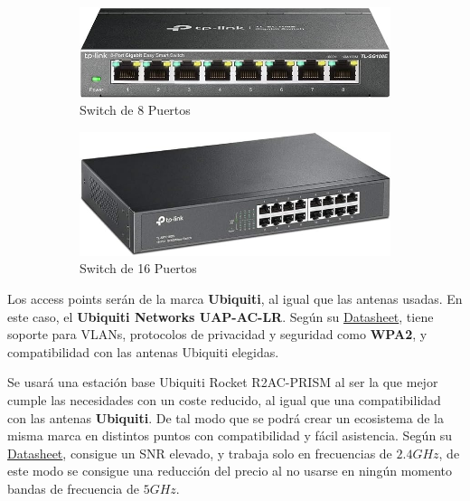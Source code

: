 \documentclass{article}
\begin{document}
\begin{figure}[h]
	\centering
	\begin{subfigure}{0.3\textwidth}
		\includegraphics[width=\linewidth]{src/switch 8.jpg}
		\caption{Switch de 8 Puertos}
		\label{fig:switch8}
	\end{subfigure}%
	\begin{subfigure}{0.3\textwidth}
		\includegraphics[width=\linewidth]{src/switch 16.jpg}
		\caption{Switch de 16 Puertos}
		\label{fig:switch16}
	\end{subfigure}
	\caption{}
	\label{fig:switches}
\end{figure}

Los access points serán de la marca \textbf{Ubiquiti}, al igual que las antenas usadas. En este caso, el \textbf{Ubiquiti Networks UAP-AC-LR}. Según su \href{https://dl.ubnt.com/datasheets/unifi/UniFi_AC_APs_DS.pdf}{Datasheet}, tiene soporte para VLANs, protocolos de privacidad y seguridad como \textbf{WPA2}, y compatibilidad con las antenas Ubiquiti elegidas.

\quad

Se usará una estación base Ubiquiti Rocket R2AC-PRISM al ser la que mejor cumple las necesidades con un coste reducido, al igual que una compatibilidad con las antenas \textbf{Ubiquiti}. De tal modo que se podrá crear un ecosistema de la misma marca en distintos puntos con compatibilidad y fácil asistencia. Según su \href{https://dl.ubnt.com/datasheets/RocketAC/Rocket_R2AC_DS.pdf}{Datasheet}, consigue un SNR elevado, y trabaja solo en frecuencias de $2.4GHz$, de este modo se consigue una reducción del precio al no usarse en ningún momento bandas de frecuencia de $5GHz$.
\end{document}
